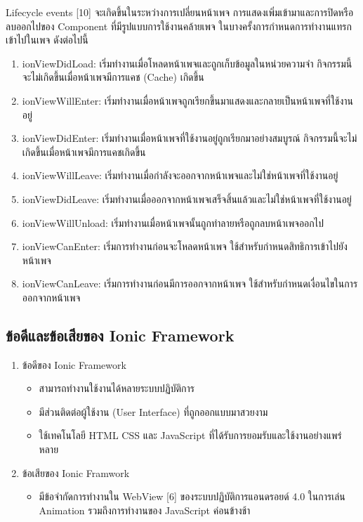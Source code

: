 		Lifecycle events [10] จะเกิดขึ้นในระหว่างการเปลี่ยนหน้าเพจ 
		การแสดงเพิ่มเข้ามาและการปิดหรือลบออกไปของ Component ที่มีรูปแบบการใช้งานคล้ายเพจ 
		ในบางครั้งการกำหนดการทำงานแทรกเข้าไปในเพจ ดังต่อไปนี้

		\begin{enumerate}
			\item ionViewDidLoad: เริ่มทำงานเมื่อโหลดหน้าเพจและถูกเก็บข้อมูลในหน่วยความจำ กิจกรรมนี้จะไม่เกิดขึ้นเมื่อหน้าเพจมีการแคช (Cache) เกิดขึ้น
			\item ionViewWillEnter: เริ่มทำงานเมื่อหน้าเพจถูกเรียกขึ้นมาแสดงและกลายเป็นหน้าเพจที่ใช้งานอยู่
			\item ionViewDidEnter: เริ่มทำงานเมื่อหน้าเพจที่ใช้งานอยู่ถูกเรียกมาอย่างสมบูรณ์ กิจกรรมนี้จะไม่เกิดขึ้นเมื่อหน้าเพจมีการแคชเกิดขึ้น
			\item ionViewWillLeave: เริ่มทำงานเมื่อกำลังจะออกจากหน้าเพจและไม่ใช่หน้าเพจที่ใช้งานอยู่
			\item ionViewDidLeave: เริ่มทำงานเมื่อออกจากหน้าเพจเสร็จสิ้นแล้วและไม่ใช่หน้าเพจที่ใช้งานอยู่
			\item ionViewWillUnload: เริ่มทำงานเมื่อหน้าเพจนั้นถูกทำลายหรือถูกลบหน้าเพจออกไป
			\item ionViewCanEnter: เริ่มการทำงานก่อนจะโหลดหน้าเพจ ใช้สำหรับกำหนดสิทธิการเข้าไปยังหน้าเพจ
			\item ionViewCanLeave: เริ่มการทำงานก่อนมีการออกจากหน้าเพจ ใช้สำหรับกำหนดเงื่อนไขในการออกจากหน้าเพจ
		\end{enumerate}

	\subsection{ข้อดีและข้อเสียของ Ionic Framework}
		\begin{enumerate}
			\item ข้อดีของ Ionic Framework
			\begin{itemize}
				\item สามารถทำงานใช้งานได้หลายระบบปฏิบัติการ
				\item มีส่วนติดต่อผู้ใช้งาน (User Interface) ที่ถูกออกแบบมาสวยงาม 
				\item ใช้เทคโนโลยี HTML CSS และ JavaScript ที่ได้รับการยอมรับและใช้งานอย่างแพร่หลาย	
			\end{itemize}
			\item ข้อเสียของ Ionic Framwork
				\begin{itemize}
					\item มีข้อจำกัดการทำงานใน WebView [6] ของระบบปฏิบัติการแอนดรอยด์ 4.0 ในการเล่น Animation รวมถึงการทำงานของ JavaScript ค่อนข้างช้า
				\end{itemize}
		\end{enumerate}

